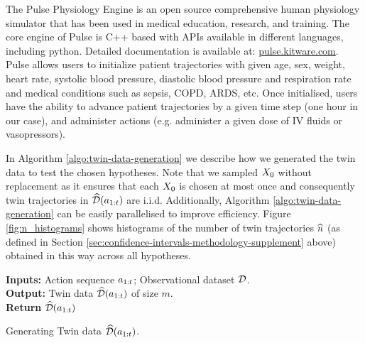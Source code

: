 The Pulse Physiology Engine is an open source comprehensive human physiology simulator that has been used in medical education, research, and training. The core engine of Pulse is C++ based with APIs available in different languages, including python. Detailed documentation is available at: \href{https://pulse.kitware.com/}{pulse.kitware.com}.
Pulse allows users to initialize patient trajectories with given age, sex, weight, heart rate, systolic blood pressure, diastolic blood pressure and respiration rate and medical conditions such as sepsis, COPD, ARDS, etc. Once initialised, users have the ability to advance patient trajectories by a given time step (one hour in our case), and administer actions (e.g. administer a given dose of IV fluids or vasopressors).

In Algorithm \ref{algo:twin-data-generation} we describe how we generated the twin data to test the chosen hypotheses. Note that we sampled $X_0$ without replacement as it ensures that each $X_0$ is chosen at most once and consequently twin trajectories in $\widehat{\mathcal{D}}(a_{1:t})$ are i.i.d. 
Additionally, Algorithm \ref{algo:twin-data-generation} can be easily parallelised to improve efficiency.
Figure \ref{fig:n_histograms} shows histograms of the number of twin trajectories $\widehat{n}$ (as defined in Section \ref{sec:confidence-intervals-methodology-supplement} above) obtained in this way across all hypotheses.

\begin{algorithm}
\SetAlgoLined
\textbf{Inputs:} Action sequence $a_{1:t}$; Observational dataset $\mathcal{D}$.\\
\textbf{Output:} Twin data $\widehat{\mathcal{D}}(a_{1:t})$ of size $m$.\\
\textbf{Return} $\widehat{\mathcal{D}}(a_{1:t})$
\caption{Generating Twin data $\widehat{\mathcal{D}}(a_{1:t})$.}
\label{algo:twin-data-generation}
\end{algorithm}


